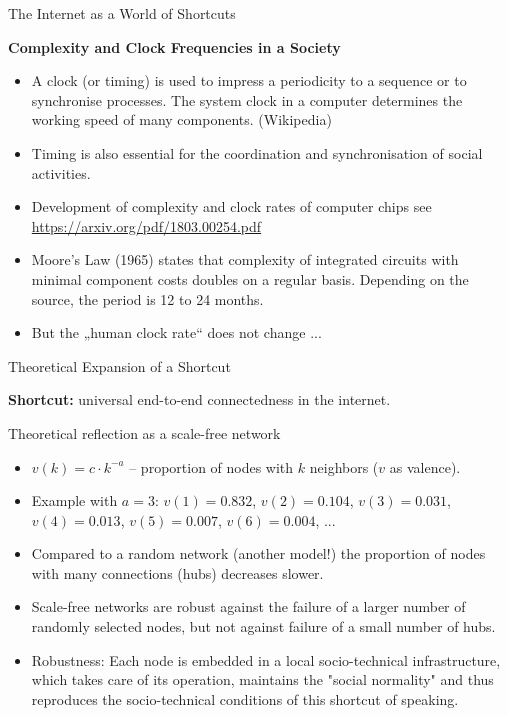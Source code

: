 \documentclass{beamer}
\newcommand{\ueberschrift}[1]{\begin{center}\bf #1\end{center}}
\begin{document}
\begin{frame}{The Internet as a World of Shortcuts}
\ueberschrift{Complexity and Clock Frequencies in a Society}
\begin{itemize}
\item A clock (or timing) is used to impress a periodicity to a sequence or to
  synchronise processes. The system clock in a computer determines the working
  speed of many components. (Wikipedia)
\item Timing is also essential for the coordination and synchronisation of
  social activities.
\item Development of complexity and clock rates of computer chips see
  \url{https://arxiv.org/pdf/1803.00254.pdf}
\item Moore's Law (1965) states that complexity of integrated circuits with
  minimal component costs doubles on a regular basis. Depending on the source,
  the period is 12 to 24 months.
\item But the „human clock rate“ does not change ...
\end{itemize}\vspace*{2em}
\end{frame}

\begin{frame}{Theoretical Expansion of a Shortcut}

  \textbf{Shortcut:} universal end-to-end connectedness in the internet.

  Theoretical reflection as a scale-free network\small
\begin{itemize}
\item $v(k)=c\cdot k^{-a}$ -- proportion of nodes with $k$ neighbors ($v$ as
  valence). \item Example with $a=3$: $v(1)=0.832$, $v(2)=0.104$,
  $v(3)=0.031$, $v(4)=0.013$, $v(5)=0.007$, $v(6)=0.004$, ...
\item Compared to a random network (another model!) the proportion of
  nodes with many connections (hubs) decreases slower.
\item Scale-free networks are robust against the failure of a larger number of
  randomly selected nodes, but not against failure of a small number of hubs.
\item Robustness: Each node is embedded in a local socio-technical
  infrastructure, which takes care of its operation, maintains the "social
  normality" and thus reproduces the socio-technical conditions of this
  shortcut of speaking.
\end{itemize}\bigskip
\end{frame}
\end{document}
